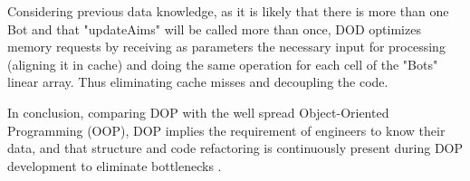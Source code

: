     Considering previous data knowledge, as it is likely that there is more than one Bot and that "updateAims" will be called more than once, DOD optimizes memory requests by receiving as parameters the necessary input for processing (aligning it in cache) and doing the same operation for each cell of the "Bots" linear array. Thus eliminating cache misses and decoupling the code.
    
    In conclusion, comparing DOP with the well spread Object-Oriented Programming (OOP), DOP implies the requirement of engineers to know their data, and that structure and code refactoring is continuously present during DOP development to eliminate bottlenecks \cite{albrecht-latency-elephant}.



